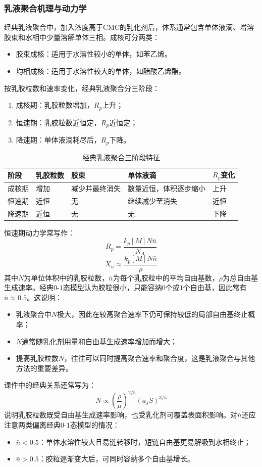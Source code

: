 ﻿\documentclass[12pt,a4paper]{article}
\renewcommand{\arraystretch}{1.18}
\begin{document}
\subsubsection{乳液聚合机理与动力学}
经典乳液聚合中，加入浓度高于CMC的乳化剂后，体系通常包含单体液滴、增溶胶束和水相中少量溶解单体三相。成核可分两类：
\begin{itemize}
  \item 胶束成核：适用于水溶性较小的单体，如苯乙烯。
  \item 均相成核：适用于水溶性较大的单体，如醋酸乙烯酯。
\end{itemize}
按乳胶粒数和速率变化，经典乳液聚合分三阶段：
\begin{enumerate}[1)]
  \item 成核期：乳胶粒数增加，$R_p$上升；
  \item 恒速期：乳胶粒数近恒定，$R_p$近恒定；
  \item 降速期：单体液滴耗尽后，$R_p$下降。
\end{enumerate}
\begin{table}[!htbp]
  \centering
  \caption{经典乳液聚合三阶段特征}
  {\small
  \setlength{\tabcolsep}{5pt}
  \renewcommand{\arraystretch}{1.22}
  \begin{tabularx}{\textwidth}{C{1.7cm}C{2.0cm}C{1.7cm}Y C{1.8cm}}
    \toprule
    \textbf{阶段} & \textbf{乳胶粒数} & \textbf{胶束} & \textbf{单体液滴} & \textbf{$R_p$变化} \\
    \midrule
    成核期 & 增加 & 减少并最终消失 & 数量近恒，体积逐步缩小 & 上升 \\
    恒速期 & 近恒 & 无 & 继续减少至消失 & 近恒 \\
    降速期 & 近恒 & 无 & 无 & 下降 \\
    \bottomrule
  \end{tabularx}
  }
\end{table}
恒速期动力学常写作：
\[
R_p=\frac{k_p[M]N\bar{n}}{N_A}
\]
\[
\bar{X}_n\approx \frac{k_p[M]N\bar{n}}{\rho}
\]
其中$N$为单位体积中的乳胶粒数，$\bar{n}$为每个乳胶粒中的平均自由基数，$\rho$为总自由基生成速率。经典$0$-$1$态模型认为胶粒很小，只能容纳$0$个或$1$个自由基，因此常有$\bar{n}\approx0.5$。这说明：
\begin{itemize}
  \item 乳液聚合中$N$极大，因此在较高聚合速率下仍可保持较低的局部自由基终止概率；
  \item $N$通常随乳化剂用量和自由基生成速率增加而增大；
  \item 提高乳胶粒数$N$，往往可以同时提高聚合速率和聚合度，这是乳液聚合与其他方法的重要差异。
\end{itemize}
课件中的经典关系还常写为：
\[
N\propto \left(\frac{\rho}{\mu}\right)^{2/5}(a_sS)^{3/5}
\]
说明乳胶粒数既受自由基生成速率影响，也受乳化剂可覆盖表面积影响。对$\bar{n}$还应注意两类偏离经典$0$-$1$态模型的情况：
\begin{itemize}
  \item $\bar{n}<0.5$：单体水溶性较大且易链转移时，短链自由基更易解吸到水相终止；
  \item $\bar{n}>0.5$：胶粒逐渐变大后，可同时容纳多个自由基增长。
\end{itemize}
\end{document}
